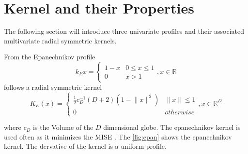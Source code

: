 \section{Kernel and their Properties} %
\label{sec:kernel_properties}
The following section will introduce three univariate profiles and
their associated multivariate radial symmetric kernels.

From the Epanechnikov profile
\begin{equation}\label{eq:epa}
  k_E{x} = \begin{cases}
    1 - x &  0 \leq x \leq 1\\
    0 & x > 1
  \end{cases}, x \in \mathbb{R}
\end{equation}
follows a radial symmetric kernel
\begin{equation}\label{eq:epak}
  K_E(x) = \begin{cases}
    \frac{1}{2}c_D^{-1}(D+2)(1-\lVert x \rVert^2) &  \lVert x \rVert \leq 1 \\
    0 & \mathit{otherwise}
  \end{cases}, x \in \mathbb{R}^D
\end{equation}

where $c_D$ is the Volume of the $D$ dimensional globe. The
epanechnikov kernel is used often as it minimizes the \gls{MISE}
\citep{citeulike:5813637}. The \autoref{fig:epan} shows the
epanechnikov kernel. The dervative of the kernel is a uniform profile.



